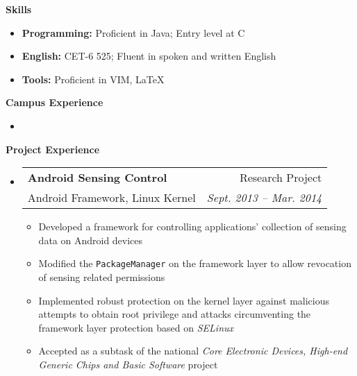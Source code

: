 \documentclass[letterpaper,10pt]{article}
\makeatletter
\newcommand{\resitem}[1]{\item #1 \vspace{-2pt}}
\newcommand{\resheading}[1]{{\large \colorbox{mygrey}{\begin{minipage}{\textwidth}{\textbf{#1 \vphantom{p\^{E}}}}\end{minipage}}}}
\newcommand{\ressubheading}[4]{
\begin{tabular*}{6.5in}{l@{\extracolsep{\fill}}r}
		\textbf{#1} & #2 \\
		#3 & #4 \\
\end{tabular*}\vspace{-6pt}}
\makeatother
\begin{document}
\resheading{Skills}
	\begin{itemize}
		\item
            \textbf{Programming:} Proficient in Java; Entry level at C
        \item    
            \textbf{English:} CET-6 525; Fluent in spoken and written English
        \item   
            \textbf{Tools:} Proficient in VIM, \LaTeX 
	\end{itemize} %

\resheading{Campus Experience}
	\begin{itemize}
		\item 
	\end{itemize}


\resheading{Project Experience}
	\begin{itemize}
		\item
			\ressubheading{Android Sensing Control}{Research Project}{Android Framework, Linux Kernel}{\emph{Sept. 2013 -- Mar. 2014}}
			{\begin{itemize}
				\resitem{Developed a framework for controlling applications' collection of sensing data on Android devices}
                \resitem{Modified the \texttt{PackageManager} on the framework layer to allow revocation of sensing related permissions}
				\resitem{Implemented robust protection on the kernel layer against malicious attempts to obtain root privilege and attacks circumventing the framework layer protection based on \emph{SELinux}}
				\resitem{Accepted as a subtask of the national \emph{Core Electronic Devices, High-end Generic Chips and Basic Software} project}
			\end{itemize}
			}	
	\end{itemize}
			
\end{document}
